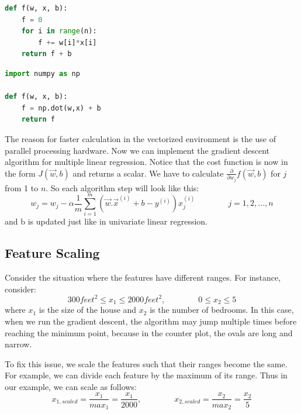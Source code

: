 \documentclass[a4paper, 12pt]{book}
\begin{document}
\begin{table}[h]
\noindent\begin{minipage}{.45\textwidth}
\begin{lstlisting}[language=Python, caption={without vectorization}]
def f(w, x, b):
    f = 0
    for i in range(n):
        f += w[i]*x[i]
    return f + b
\end{lstlisting}
\end{minipage}\hfill
\noindent\begin{minipage}{.45\textwidth}
\begin{lstlisting}[language=Python, caption={with vectorization}]
import numpy as np

def f(w, x, b):
    f = np.dot(w,x) + b
    return f
\end{lstlisting}
\end{minipage}
\end{table}

The reason for faster calculation in the vectorized environment is the use of parallel processing hardware. Now we can implement the gradient descent algorithm for multiple linear regression. Notice that the cost function is now in the form $J(\Vec{w},b)$ and returns a scalar. We have to calculate ${\frac{\partial}{\partial w_j}}f(\Vec{w},b)$ for $j$ from 1 to $n$. So each algorithm step will look like this: \[w_j = w_j - \alpha\frac{1}{m} \sum_{i=1}^{m} (\Vec{w}.\Vec{x}^{(i)} + b - y^{(i)})x_j^{(i)} \qquad\qquad j=1,2,...,n\] and b is updated just like in univariate linear regression.

\subsection{Feature Scaling}
Consider the situation where the features have different ranges. For instance, consider: \[300 feet^2 \leq x_1 \leq 2000 feet^2 , \qquad \qquad 0 \leq x_2 \leq 5\] where $x_1$ is the size of the house and $x_2$ is the number of bedrooms. In this case, when we run the gradient descent, the algorithm may jump multiple times before reaching the minimum point, because in the counter plot, the ovals are long and narrow.

To fix this issue, we scale the features such that their ranges become the same. For example, we can divide each feature by the maximum of its range. Thus in our example, we can scale as follows: \[x_{1, scaled} = \frac{x_1}{max_1} = \frac{x_1}{2000}, \qquad \qquad x_{2, scaled} = \frac{x_2}{max_2} = \frac{x_2}{5}\]
\end{document}

